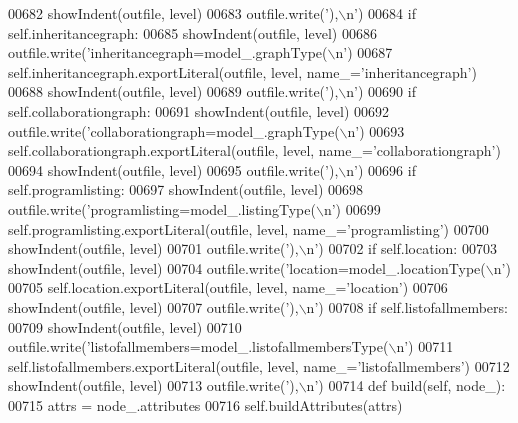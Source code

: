 \begin{DoxyCode}
{{{{{{{{{{{{{{{{{{{{{{{{{{{{{{{{{{{00682             showIndent(outfile, level)
00683             outfile.write(\textcolor{stringliteral}{'),\(\backslash\)n'})
00684         \textcolor{keywordflow}{if} self.inheritancegraph:
00685             showIndent(outfile, level)
00686             outfile.write(\textcolor{stringliteral}{'inheritancegraph=model\_.graphType(\(\backslash\)n'})
00687             self.inheritancegraph.exportLiteral(outfile, level, name\_=\textcolor{stringliteral}{'inheritancegraph'})
00688             showIndent(outfile, level)
00689             outfile.write(\textcolor{stringliteral}{'),\(\backslash\)n'})
00690         \textcolor{keywordflow}{if} self.collaborationgraph:
00691             showIndent(outfile, level)
00692             outfile.write(\textcolor{stringliteral}{'collaborationgraph=model\_.graphType(\(\backslash\)n'})
00693             self.collaborationgraph.exportLiteral(outfile, level, name\_=\textcolor{stringliteral}{'collaborationgraph'})
00694             showIndent(outfile, level)
00695             outfile.write(\textcolor{stringliteral}{'),\(\backslash\)n'})
00696         \textcolor{keywordflow}{if} self.programlisting:
00697             showIndent(outfile, level)
00698             outfile.write(\textcolor{stringliteral}{'programlisting=model\_.listingType(\(\backslash\)n'})
00699             self.programlisting.exportLiteral(outfile, level, name\_=\textcolor{stringliteral}{'programlisting'})
00700             showIndent(outfile, level)
00701             outfile.write(\textcolor{stringliteral}{'),\(\backslash\)n'})
00702         \textcolor{keywordflow}{if} self.location:
00703             showIndent(outfile, level)
00704             outfile.write(\textcolor{stringliteral}{'location=model\_.locationType(\(\backslash\)n'})
00705             self.location.exportLiteral(outfile, level, name\_=\textcolor{stringliteral}{'location'})
00706             showIndent(outfile, level)
00707             outfile.write(\textcolor{stringliteral}{'),\(\backslash\)n'})
00708         \textcolor{keywordflow}{if} self.listofallmembers:
00709             showIndent(outfile, level)
00710             outfile.write(\textcolor{stringliteral}{'listofallmembers=model\_.listofallmembersType(\(\backslash\)n'})
00711             self.listofallmembers.exportLiteral(outfile, level, name\_=\textcolor{stringliteral}{'listofallmembers'})
00712             showIndent(outfile, level)
00713             outfile.write(\textcolor{stringliteral}{'),\(\backslash\)n'})
00714     \textcolor{keyword}{def }build(self, node\_):
00715         attrs = node\_.attributes
00716         self.buildAttributes(attrs)
}}}}}}}}}}}}}}}}}}}}}}}}}}}}}}}}}}}
\end{DoxyCode}
